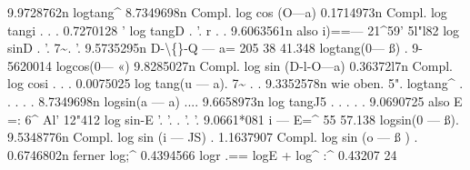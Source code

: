 \documentclass[12pt,a4paper]{article}
\begin{document}
9.9728762n
logtang\^{}
8.7349698n
Compl.  log  cos (O---a)         0.1714973n
Compl.  log  tangi   .      .      .      0.7270128  '
log  tangD     .      '.     r    .      .      9.6063561n        also  i)==--- 21\^{}59'    5l"l82
log  sinD       .      '.     7\textasciitilde{}.     '.     9.5735295n  D-\textbackslash\{\}-Q  ---  a=     205     38     41.348
logtang(0--- ß)     .                  9-5620014
logcos(0--- «)                      9.8285027n
Compl.  log  sin  (D-l-O---a)  0.36372l7n
Compl.  log  cosi      .      .      .      0.0075025
log  tang(u --- a).     7\textasciitilde{} .     .     9.3352578n       wie  oben.
5".
logtang\^{}     .      .      .      .      .  8.7349698n
logsin(a  --- a)  ....  9.6658973n
log  tangJ5     .      .     .     .     .  9.0690725  also  E  =:  6\^{}  Al'    12"412
log  sin-E       '.      '.      .      '.      '.  9.0661*081  i  ---  E=\^{}     55     57.138
logsin(0  --- ß).                    9.5348776n
Compl.  log  sin (i  ---  JS)      .  1.1637907
Compl.  log  sin (o --- ß )      .  0.6746802n  ferner
log;\^{}    0.4394566  logr  .==  logE  +  log\^{}  :\^{}  0.43207  24
\end{document}
